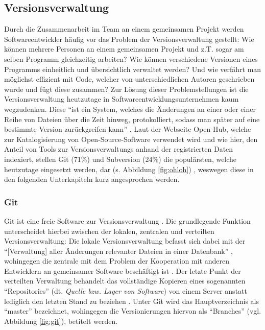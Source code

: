 \subsection{Versionsverwaltung}
Durch die Zusammenarbeit im Team an einem gemeinsamen Projekt werden Softwareentwickler häufig vor das Problem der Versionsverwaltung gestellt: Wie können mehrere Personen an einem gemeinsamen Projekt und z.T. sogar am selben Programm gleichzeitig arbeiten?
Wie können verschiedene Versionen eines Programms einheitlich und übersichtlich verwaltet werden? Und wie verfährt man möglichst effizient mit Code, welcher von unterschiedlichen Autoren geschrieben wurde und fügt diese zusammen? \newline Zur Lösung dieser Problemstellungen 
ist die Versionsverwaltung heutzutage in Softwareentwicklungsunternehmen kaum wegzudenken. Diese \enquote{ist ein System, welches die Änderungen an einer oder einer Reihe von Dateien über die Zeit hinweg, protokolliert, sodass man später auf eine bestimmte Version 
zurückgreifen kann} \cite{Scott-Chacon:2020aa}. \newline \newline Laut der Webseite Open Hub, welche zur Katalogisierung von Open-Source-Software verwendet wird und wie hier, den Anteil von Tools zur Versionsverwaltungs anhand der registrierten Daten indexiert, stellen Git (71\%) 
und Subversion (24\%) die populärsten, welche heutzutage eingesetzt werden, dar (s. Abbildung \ref{fig:ohloh}) \cite{Inc.:2020aa}, weswegen diese in den folgenden Unterkapiteln kurz angesprochen werden.
\pagebreak
\subsubsection{Git} \label{git}
Git ist eine freie Software zur Versionsverwaltung \cite{Git:2020aa}. Die grundlegende Funktion unterscheidet hierbei zwischen der lokalen, zentralen und verteilten Versionsverwaltung: Die lokale Versionsverwaltung befasst sich dabei mit der \enquote{[Verwaltung] aller Änderungen relevanter Dateien in einer Datenbank} \cite{Scott-Chacon:2020aa}, wohingegen die
zentrale mit dem Problem der Kooperation mit anderen Entwicklern an gemeinsamer Software beschäftigt ist \cite{Scott-Chacon:2020aa}. Der letzte Punkt der verteilten Verwaltung behandelt das vollständige Kopieren eines sogenannten \enquote{Repositories} (dt. \textit{Quelle bzw. Lager von Software})
von einem Server anstatt lediglich den letzten Stand zu beziehen \cite{Scott-Chacon:2020aa}. Unter Git wird das Hauptverzeichnis als \enquote{master} bezeichnet, wohingegen die Versionierungen hiervon als \enquote{Branches} (vgl. Abbildung \ref{fig:git}), betitelt werden.

